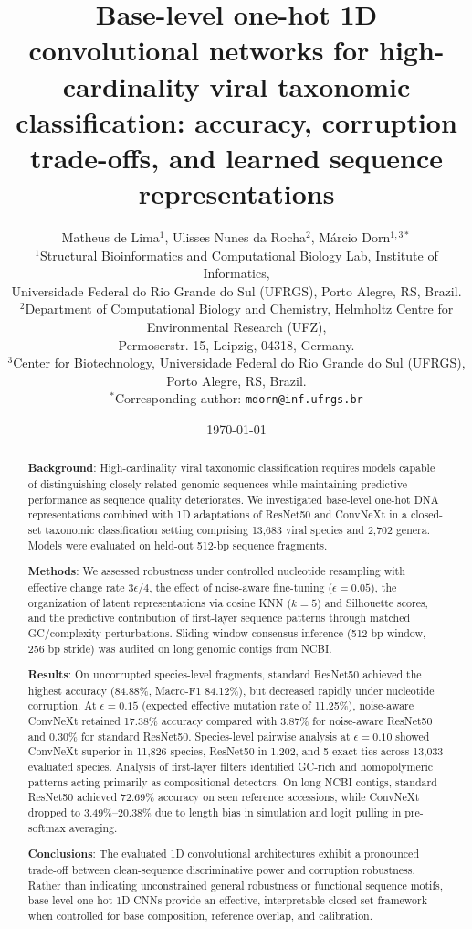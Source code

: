 \documentclass[11pt,a4paper]{article}
\title{\textbf{Base-level one-hot 1D convolutional networks for high-cardinality viral taxonomic classification: accuracy, corruption trade-offs, and learned sequence representations}}
\author{
  Matheus de Lima$^{1}$, Ulisses Nunes da Rocha$^{2}$, M\'{a}rcio Dorn$^{1,3*}$ \\[0.5em]
  \small $^{1}$Structural Bioinformatics and Computational Biology Lab, Institute of Informatics, \\
  \small Universidade Federal do Rio Grande do Sul (UFRGS), Porto Alegre, RS, Brazil. \\
  \small $^{2}$Department of Computational Biology and Chemistry, Helmholtz Centre for Environmental Research (UFZ), \\
  \small Permoserstr. 15, Leipzig, 04318, Germany. \\
  \small $^{3}$Center for Biotechnology, Universidade Federal do Rio Grande do Sul (UFRGS), Porto Alegre, RS, Brazil. \\[0.5em]
  \small $^{*}$Corresponding author: \texttt{mdorn@inf.ufrgs.br}
}
\date{\today}
\begin{document}
\maketitle

\begin{abstract}
\noindent\textbf{Background}: High-cardinality viral taxonomic classification requires models capable of distinguishing closely related genomic sequences while maintaining predictive performance as sequence quality deteriorates. We investigated base-level one-hot DNA representations combined with 1D adaptations of ResNet50 and ConvNeXt in a closed-set taxonomic classification setting comprising 13,683 viral species and 2,702 genera. Models were evaluated on held-out 512-bp sequence fragments.

\par\vspace{0.5em}\noindent\textbf{Methods}: We assessed robustness under controlled nucleotide resampling with effective change rate $3\epsilon/4$, the effect of noise-aware fine-tuning ($\epsilon=0.05$), the organization of latent representations via cosine KNN ($k=5$) and Silhouette scores, and the predictive contribution of first-layer sequence patterns through matched GC/complexity perturbations. Sliding-window consensus inference (512 bp window, 256 bp stride) was audited on long genomic contigs from NCBI.

\par\vspace{0.5em}\noindent\textbf{Results}: On uncorrupted species-level fragments, standard ResNet50 achieved the highest accuracy (84.88\%, Macro-F1 84.12\%), but decreased rapidly under nucleotide corruption. At $\epsilon = 0.15$ (expected effective mutation rate of 11.25\%), noise-aware ConvNeXt retained 17.38\% accuracy compared with 3.87\% for noise-aware ResNet50 and 0.30\% for standard ResNet50. Species-level pairwise analysis at $\epsilon=0.10$ showed ConvNeXt superior in 11,826 species, ResNet50 in 1,202, and 5 exact ties across 13,033 evaluated species. Analysis of first-layer filters identified GC-rich and homopolymeric patterns acting primarily as compositional detectors. On long NCBI contigs, standard ResNet50 achieved 72.69\% accuracy on seen reference accessions, while ConvNeXt dropped to 3.49\%--20.38\% due to length bias in simulation and logit pulling in pre-softmax averaging.

\par\vspace{0.5em}\noindent\textbf{Conclusions}: The evaluated 1D convolutional architectures exhibit a pronounced trade-off between clean-sequence discriminative power and corruption robustness. Rather than indicating unconstrained general robustness or functional sequence motifs, base-level one-hot 1D CNNs provide an effective, interpretable closed-set framework when controlled for base composition, reference overlap, and calibration.
\end{abstract}
\end{document}
